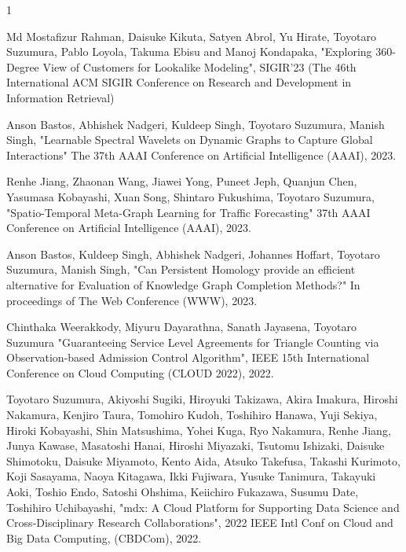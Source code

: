 \begin{査読付}{1}




Md Mostafizur Rahman, Daisuke Kikuta, Satyen Abrol, Yu Hirate, Toyotaro Suzumura, Pablo Loyola, Takuma Ebisu and Manoj Kondapaka, "Exploring 360-Degree View of Customers for Lookalike Modeling",  SIGIR'23 (The 46th International ACM
SIGIR Conference on Research and Development in Information
Retrieval) 


Anson Bastos, Abhishek Nadgeri, Kuldeep Singh, Toyotaro Suzumura, Manish Singh,
"Learnable Spectral Wavelets on Dynamic Graphs to Capture Global Interactions"
The 37th AAAI Conference on Artificial Intelligence (AAAI), 2023.

Renhe Jiang, Zhaonan Wang, Jiawei Yong, Puneet Jeph, Quanjun Chen, Yasumasa Kobayashi, Xuan Song, Shintaro Fukushima, Toyotaro Suzumura,
"Spatio-Temporal Meta-Graph Learning for Traffic Forecasting"
37th AAAI Conference on Artificial Intelligence (AAAI), 2023.

Anson Bastos, Kuldeep Singh, Abhishek Nadgeri, Johannes Hoffart, Toyotaro Suzumura, Manish Singh,
"Can Persistent Homology provide an efficient alternative for Evaluation of Knowledge Graph Completion Methods?"
In proceedings of The Web Conference (WWW), 2023.


Chinthaka Weerakkody, Miyuru Dayarathna, Sanath Jayasena, Toyotaro Suzumura
"Guaranteeing Service Level Agreements for Triangle Counting via Observation-based Admission Control Algorithm", IEEE 15th International Conference on Cloud Computing (CLOUD 2022), 2022.

Toyotaro Suzumura, Akiyoshi Sugiki, Hiroyuki Takizawa, Akira Imakura, Hiroshi Nakamura, Kenjiro Taura, Tomohiro Kudoh, Toshihiro Hanawa, Yuji Sekiya, Hiroki Kobayashi, Shin Matsushima, Yohei Kuga, Ryo Nakamura, Renhe Jiang, Junya Kawase, Masatoshi Hanai, Hiroshi Miyazaki, Tsutomu Ishizaki, Daisuke Shimotoku, Daisuke Miyamoto, Kento Aida, Atsuko Takefusa, Takashi Kurimoto, Koji Sasayama, Naoya Kitagawa, Ikki Fujiwara, Yusuke Tanimura, Takayuki Aoki, Toshio Endo, Satoshi Ohshima, Keiichiro Fukazawa, Susumu Date, Toshihiro Uchibayashi,
"mdx: A Cloud Platform for Supporting Data Science and Cross-Disciplinary Research Collaborations", 2022 IEEE Intl Conf on Cloud and Big Data Computing, (CBDCom), 2022.


\end{査読付}
